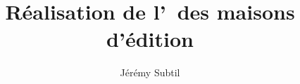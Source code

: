 \documentclass[a4paper,oneside,12pt]{report}
\title{Réalisation de l'\aintranet\ des maisons d'édition \aey}
\author{Jérémy Subtil}
\begin{document}

\newpage

\tableofcontents
\listoffigures
\listoftables
\lstlistoflistings
\newpage


\newpage




\newpage

%
%


\end{document}
